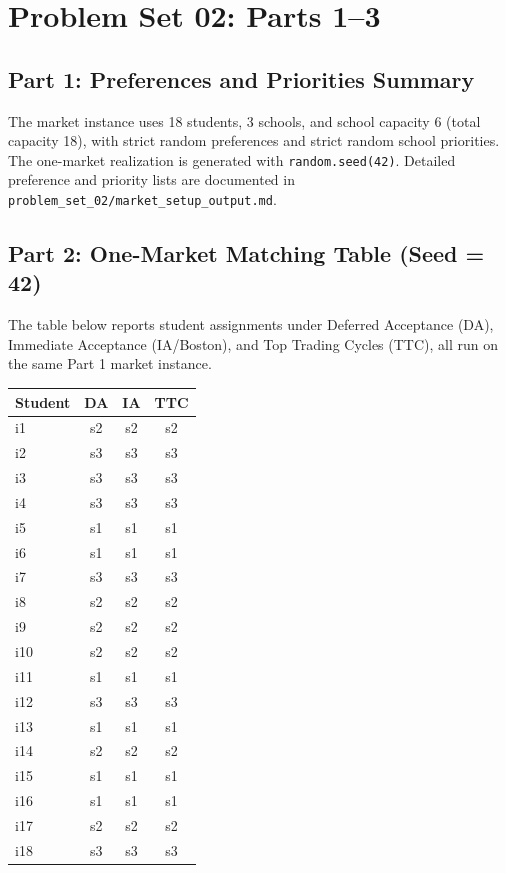 
\section*{Problem Set 02: Parts 1--3}

\subsection*{Part 1: Preferences and Priorities Summary}
The market instance uses 18 students, 3 schools, and school capacity 6 (total capacity 18), with strict random preferences and strict random school priorities. The one-market realization is generated with \texttt{random.seed(42)}. Detailed preference and priority lists are documented in \texttt{problem\_set\_02/market\_setup\_output.md}.

\subsection*{Part 2: One-Market Matching Table (Seed = 42)}
The table below reports student assignments under Deferred Acceptance (DA), Immediate Acceptance (IA/Boston), and Top Trading Cycles (TTC), all run on the same Part 1 market instance.

\begin{center}
\begin{tabular}{lccc}
\hline
Student & DA & IA & TTC \\
\hline
i1 & s2 & s2 & s2 \\
i2 & s3 & s3 & s3 \\
i3 & s3 & s3 & s3 \\
i4 & s3 & s3 & s3 \\
i5 & s1 & s1 & s1 \\
i6 & s1 & s1 & s1 \\
i7 & s3 & s3 & s3 \\
i8 & s2 & s2 & s2 \\
i9 & s2 & s2 & s2 \\
i10 & s2 & s2 & s2 \\
i11 & s1 & s1 & s1 \\
i12 & s3 & s3 & s3 \\
i13 & s1 & s1 & s1 \\
i14 & s2 & s2 & s2 \\
i15 & s1 & s1 & s1 \\
i16 & s1 & s1 & s1 \\
i17 & s2 & s2 & s2 \\
i18 & s3 & s3 & s3 \\
\hline
\end{tabular}
\end{center}

